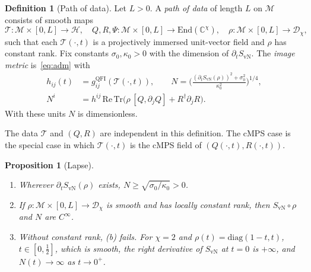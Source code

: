 \documentclass[11pt,a4paper,reqno]{amsart}
\newtheorem{proposition}[theorem]{Proposition}
\theoremstyle{definition}
\newtheorem{definition}[theorem]{Definition}
\numberwithin{equation}{section}
\newcommand{\C}{\mathbb{C}}
\newcommand{\Tr}{\mathrm{Tr}}
\newcommand{\End}{\mathrm{End}}
\newcommand{\QFI}{\mathrm{QFI}}
\newcommand{\Dens}{\mathcal{D}_\chi}
\begin{document}
\begin{definition}[Path of data]\label{def:path}
Let $L>0$. A \emph{path of data} of length $L$ on $\mathcal{M}$ consists of smooth maps
\[
\mathcal{T}:\mathcal{M}\times[0,L]\to\mathcal{H},\quad Q,R,\Psi:\mathcal{M}\times[0,L]\to\End(\C^\chi),\quad \rho:\mathcal{M}\times[0,L]\to\Dens,
\]
such that each $\mathcal{T}(\cdot,t)$ is a projectively immersed unit-vector field and $\rho$ has constant rank. Fix constants $\sigma_0,\kappa_0>0$ with the dimension of $\partial_tS_{\mathrm{vN}}$. The \emph{image metric} is~\eqref{eq:adm} with
\begin{align}
    h_{ij}(t)&=g^{\QFI}_{ij}(\mathcal{T}(\cdot,t)),\qquad
    N=\Big(\frac{(\partial_tS_{\mathrm{vN}}(\rho))^2+\sigma_0^2}{\kappa_0^2}\Big)^{1/4},\label{eq:lapse}\\
    N^i&=h^{ij}\,\mathrm{Re}\,\Tr\big(\rho\,[Q,\partial_jQ]+R^\dagger\partial_jR\big).\label{eq:shift}
\end{align}
With these units $N$ is dimensionless.
\end{definition}

The data $\mathcal{T}$ and $(Q,R)$ are independent in this definition. The cMPS case is the special case in which $\mathcal{T}(\cdot,t)$ is the cMPS field of $(Q(\cdot,t),R(\cdot,t))$.

\begin{proposition}[Lapse]\label{prop:lapse}
\begin{enumerate}[label=(\alph*)]
    \item Wherever $\partial_tS_{\mathrm{vN}}(\rho)$ exists, $N\ge\sqrt{\sigma_0/\kappa_0}>0$.
    \item If $\rho:\mathcal{M}\times[0,L]\to\Dens$ is smooth and has locally constant rank, then $S_{\mathrm{vN}}\circ\rho$ and $N$ are $C^\infty$.
    \item Without constant rank, (b) fails. For $\chi=2$ and $\rho(t)=\mathrm{diag}(1-t,t)$, $t\in[0,\tfrac12]$, which is smooth, the right derivative of $S_{\mathrm{vN}}$ at $t=0$ is $+\infty$, and $N(t)\to\infty$ as $t\to0^+$.
\end{enumerate}
\end{proposition}
\end{document}
